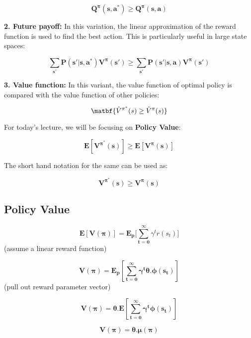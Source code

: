 \documentclass[11pt]{article}
\begin{document}
\begin{equation}
\mathbf{Q^\pi(s,a^*)\geq Q^\pi (s,a)}
\end{equation}

\textbf{2. Future payoff:} In this variation, the linear approximation of the reward function is used to find the best action. This is particularly useful in large state spaces:

\begin{equation}
\mathbf{\sum_{s'}P(s'|s,a^*)V^\pi(s')\geq \sum_{s'}P(s'|s,a)V^\pi(s')}
\end{equation}

\textbf{3. Value function:} In this variant, the value function of optimal policy is compared with the value function of other policies:

\begin{equation}
\matbf{\hat{V}^{\pi^*}(s)\geq \hat{V}^\pi(s)}
\end{equation}

For today's lecture, we will be focusing on \textbf{Policy Value}:

\begin{equation}
\mathbf{E[V^{\pi^*}(s)]\geq E[V^\pi(s)]}
\end{equation}

The short hand notation for the same can be used as:

\begin{equation}
\mathbf{V^{\pi^*}(s)\geq V^\pi(s)}
\end{equation}

\subsection{Policy Value}

\begin{equation}
\mathbf{E[V(\pi)]=E_p[\sum_{t=0}^\infty}\gamma^tr(s_t)]
\end{equation} (assume a linear reward function)

\begin{equation}
\mathbf{V(\pi)=E_p[\sum_{t=0}^\infty\gamma^t\theta.\phi(s_t)]}
\end{equation}
(pull out reward parameter vector)

\begin{equation}
\mathbf{V(\pi)=\theta.E[\sum_{t=0}^\infty\gamma^t\phi(s_t)]}
\end{equation}

\begin{equation}
\mathbf{V(\pi)=\theta.\mu(\pi)}
\end{equation}
\end{document}
